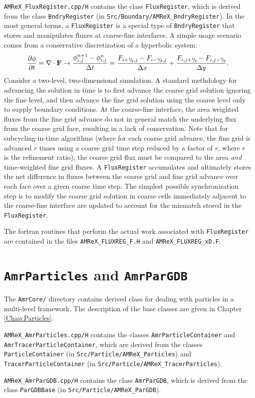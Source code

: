 {\tt AMReX\_FluxRegister.cpp/H} contains the class {\tt FluxRegister}, which is derived from
the class {\tt BndryRegister} (in {\tt Src/Boundary/AMReX\_BndryRegister}).
In the most general terms, a {\tt FluxRegister} is a special type of {\tt BndryRegister} that
stores and manipulates fluxes at coarse-fine interfaces.
A simple usage scenario comes from a conservative discretization of a hyperbolic system:
\begin{equation}
\frac{\partial\phi}{\partial t} = \nabla\cdot{\bf F}
\rightarrow
\frac{\phi_{i,j}^{n+1}-\phi_{i,j}^n}{\Delta t} = \frac{F_{i+\myhalf,j}-F_{i-\myhalf,j}}{\Delta x} + \frac{F_{i,j+\myhalf} - F_{i,j-\myhalf}}{\Delta y}.
\end{equation}
Consider a two-level, two-dimensional simulation.  A standard methdology for advancing the solution in 
time is to first advance the coarse grid solution ignoring the fine level, and then advance the fine 
grid solution using the coarse level only to supply boundary conditions.  At the coarse-fine interface, 
the area weighted fluxes from the fine grid advance do not in general match the underlying flux from 
the coarse grid face, resulting in a lack of conservation.  Note that for subcycling-in-time algorithms
(where for each coarse grid advance, the fine grid is advanced $r$ times using a coarse grid time step 
reduced by a factor of $r$, where $r$ is the refinement ratio), the coarse grid flux must 
be compared to the area {\it and} time-weighted fine grid fluxes.  A {\tt FluxRegister} accumulates 
and ultimately stores the net difference in fluxes between the coarse grid and fine grid advance over 
each face over a given coarse time step.  The simplest possible synchronization step is to modify
the coarse grid solution in coarse cells immediately adjacent to the coarse-fine interface are updated
to account for the mismatch stored in the {\tt FluxRegister}.

The fortran routines that perform the actual work associated with {\tt FluxRegister} are 
contained in the files {\tt AMReX\_FLUXREG\_F.H} and {\tt AMReX\_FLUXREG\_xD.F}.

\section{{\tt AmrParticles} and {\tt AmrParGDB}}

The {\tt AmrCore/} directory contains derived class for dealing with particles 
in a multi-level framework.  The description of the base classes
are given in Chapter \ref{Chap:Particles}.

{\tt AMReX\_AmrParticles.cpp/H} contains the classes {\tt AmrParticleContainer}
and {\tt AmrTracerParticleContainer}, which are derived from the classes
{\tt ParticleContainer} (in {\tt Src/Particle/AMReX\_Particles})
and {\tt TracerParticleContainer} (in {\tt Src/Particle/AMReX\_TracerParticles}).

{\tt AMReX\_AmrParGDB.cpp/H} contains the class {\tt AmrParGDB}, which is derived from
the class {\tt ParGDBBase} (in {\tt Src/Particle/AMReX\_ParGDB}).
